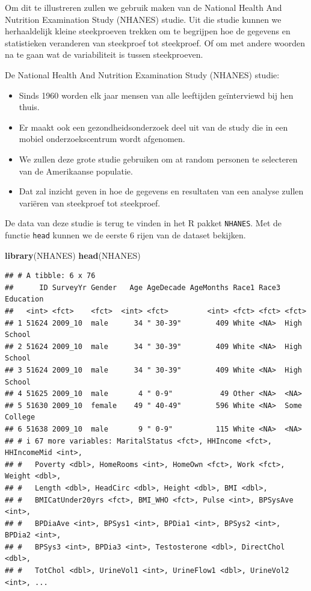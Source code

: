\documentclass[
  12pt,dutch]{book}
\newenvironment{Shaded}{\begin{snugshade}}{\end{snugshade}}
\newcommand{\FunctionTok}[1]{\textcolor[rgb]{0.13,0.29,0.53}{\textbf{#1}}}
\newcommand{\NormalTok}[1]{#1}
\theoremstyle{definition}
\theoremstyle{definition}
\theoremstyle{definition}
\theoremstyle{definition}
\theoremstyle{remark}
\begin{document}
Om dit te illustreren zullen we gebruik maken van de National Health And Nutrition Examination Study (NHANES) studie. Uit die studie kunnen we herhaaldelijk kleine steekproeven trekken om te begrijpen hoe de gegevens en statistieken veranderen van steekproef tot steekproef. Of om met andere woorden na te gaan wat de variabiliteit is tussen steekproeven.

De National Health And Nutrition Examination Study (NHANES) studie:

\begin{itemize}
\item
  Sinds 1960 worden elk jaar mensen van alle leeftijden geïnterviewd bij hen thuis.
\item
  Er maakt ook een gezondheidsonderzoek deel uit van de study die in een mobiel onderzoekscentrum wordt afgenomen.
\item
  We zullen deze grote studie gebruiken om at random personen te selecteren van de Amerikaanse populatie.
\item
  Dat zal inzicht geven in hoe de gegevens en resultaten van een analyse zullen variëren van steekproef tot steekproef.
\end{itemize}

De data van deze studie is terug te vinden in het R pakket \texttt{NHANES}. Met de functie \texttt{head} kunnen we de eerste 6 rijen van de dataset bekijken.

\begin{Shaded}
\begin{Highlighting}[]
\FunctionTok{library}\NormalTok{(NHANES)}
\FunctionTok{head}\NormalTok{(NHANES)}
\end{Highlighting}
\end{Shaded}

\begin{verbatim}
## # A tibble: 6 x 76
##      ID SurveyYr Gender   Age AgeDecade AgeMonths Race1 Race3 Education   
##   <int> <fct>    <fct>  <int> <fct>         <int> <fct> <fct> <fct>       
## 1 51624 2009_10  male      34 " 30-39"        409 White <NA>  High School 
## 2 51624 2009_10  male      34 " 30-39"        409 White <NA>  High School 
## 3 51624 2009_10  male      34 " 30-39"        409 White <NA>  High School 
## 4 51625 2009_10  male       4 " 0-9"           49 Other <NA>  <NA>        
## 5 51630 2009_10  female    49 " 40-49"        596 White <NA>  Some College
## 6 51638 2009_10  male       9 " 0-9"          115 White <NA>  <NA>        
## # i 67 more variables: MaritalStatus <fct>, HHIncome <fct>, HHIncomeMid <int>,
## #   Poverty <dbl>, HomeRooms <int>, HomeOwn <fct>, Work <fct>, Weight <dbl>,
## #   Length <dbl>, HeadCirc <dbl>, Height <dbl>, BMI <dbl>,
## #   BMICatUnder20yrs <fct>, BMI_WHO <fct>, Pulse <int>, BPSysAve <int>,
## #   BPDiaAve <int>, BPSys1 <int>, BPDia1 <int>, BPSys2 <int>, BPDia2 <int>,
## #   BPSys3 <int>, BPDia3 <int>, Testosterone <dbl>, DirectChol <dbl>,
## #   TotChol <dbl>, UrineVol1 <int>, UrineFlow1 <dbl>, UrineVol2 <int>, ...
\end{verbatim}
\end{document}
